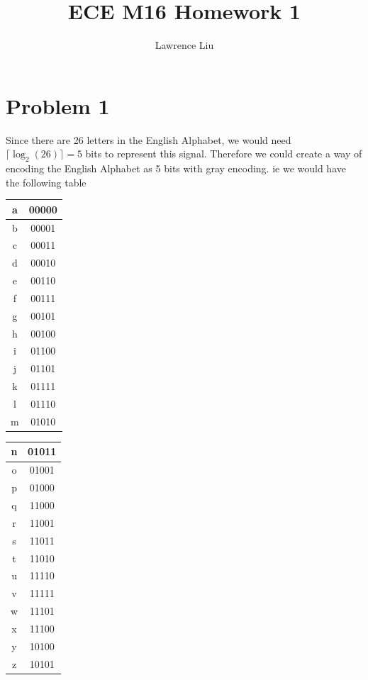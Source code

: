 \documentclass[12pt]{article}
\title{ECE M16 Homework 1}
\author{Lawrence Liu}
\begin{document}
\maketitle
\section*{Problem 1}
Since there are 26 letters in the English Alphabet, we would need $\lceil \log_2 (26)\rceil=5$ bits to represent this signal.
Therefore we could create a way of encoding the English Alphabet as 5 bits with gray encoding. ie we would have the following table
\begin{center}
    \begin{tabular}{|c|c|}
        a & 00000 \\
        \hline
        b & 00001 \\
        \hline
        c & 00011 \\
        \hline
        d & 00010 \\
        \hline
        e & 00110 \\
        \hline
        f & 00111 \\
        \hline
        g & 00101 \\
        \hline
        h & 00100 \\
        \hline
        i & 01100 \\
        \hline
        j & 01101 \\
        \hline
        k & 01111 \\
        \hline
        l & 01110 \\
        \hline
        m & 01010 \\
        \hline
    \end{tabular}
    \quad
    \begin{tabular}{|c|c|}
        n & 01011 \\
        \hline
        o & 01001 \\
        \hline
        p & 01000 \\
        \hline
        q & 11000 \\
        \hline
        r & 11001 \\
        \hline
        s & 11011 \\
        \hline
        t & 11010 \\
        \hline
        u & 11110 \\
        \hline
        v & 11111 \\
        \hline
        w & 11101 \\
        \hline
        x & 11100 \\
        \hline
        y & 10100 \\
        \hline
        z & 10101 \\
        \hline
    \end{tabular}
\end{center}
\end{document}
